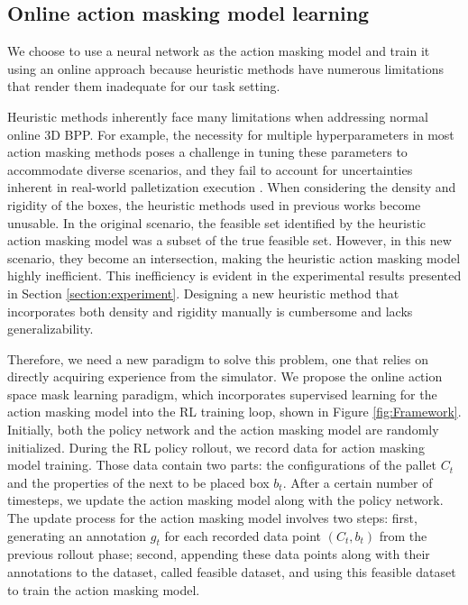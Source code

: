 \subsection{Online action masking model learning}
We choose to use a neural network as the action masking model and train it using an online approach because heuristic methods have numerous limitations that render them inadequate for our task setting.

Heuristic methods inherently face many limitations when addressing normal online 3D BPP. For example, the necessity for multiple hyperparameters in most action masking methods poses a challenge in tuning these parameters to accommodate diverse scenarios, and they fail to account for uncertainties inherent in real-world palletization execution \cite{wu2024efficient}.
When considering the density and rigidity of the boxes, the heuristic methods used in previous works become unusable. In the original scenario, the feasible set identified by the heuristic action masking model was a subset of the true feasible set. However, in this new scenario, they become an intersection, making the heuristic action masking model highly inefficient. This inefficiency is evident in the experimental results presented in Section \ref{section:experiment}. Designing a new heuristic method that incorporates both density and rigidity manually is cumbersome and lacks generalizability. 

Therefore, we need a new paradigm to solve this problem, one that relies on directly acquiring experience from the simulator. We propose the online action space mask learning paradigm, which incorporates supervised learning for the action masking model into the RL training loop, shown in Figure \ref{fig:Framework}. Initially, both the policy network and the action masking model are randomly initialized. During the RL policy rollout, we record data for action masking model training. Those data contain two parts: the configurations of the pallet $C_t$ and the properties of the next to be placed box $b_t$. 
After a certain number of timesteps, we update the action masking model along with the policy network. The update process for the action masking model involves two steps: first, generating an annotation $g_t$ for each recorded data point $(C_t, b_t)$ from the previous rollout phase; second, appending these data points along with their annotations to the dataset, called feasible dataset, and using this feasible dataset to train the action masking model.

